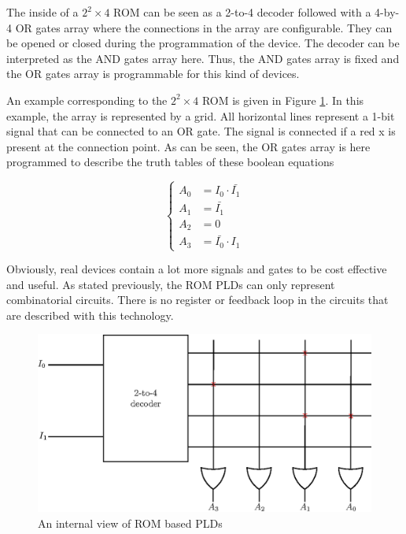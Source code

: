 The inside of a $2^2 \times 4$ ROM can be seen as a 2-to-4 decoder followed with a 4-by-4 OR gates 
array where the connections in the array are configurable. They can be opened or closed during the
programmation of the device. The decoder can be interpreted as the AND gates array here. Thus, the
AND gates array is fixed and the OR gates array is programmable for this kind of devices.

An example corresponding to the $2^2 \times 4$ ROM is given in Figure \ref{fig:fpga/pld_rom_internal}.
In this example, the array is represented by a grid. All horizontal lines represent a 1-bit signal
that can be connected to an OR gate. The signal is connected if a red x is present at the connection
point. As can be seen, the OR gates array is here programmed to describe the truth tables of these 
boolean equations

\begin{equation*}
    \begin{cases}
        A_0& = I_0 \cdot \bar{I_1} \\
        A_1& = \bar{I_1} \\
        A_2& = 0 \\
        A_3& = \bar{I_0} \cdot I_1
    \end{cases}
\end{equation*}

Obviously, real devices contain a lot more signals and gates to be cost effective and useful. 
As stated previously, the ROM PLDs can only represent combinatorial circuits. There is no register
or feedback loop in the circuits that are described with this technology.

\begin{figure}[ht]
    \centering
    \includegraphics[scale=0.8]{Chapter1-Hardware/res/pld_rom_internal}
    \caption{An internal view of ROM based PLDs}
    \label{fig:fpga/pld_rom_internal}
\end{figure}

